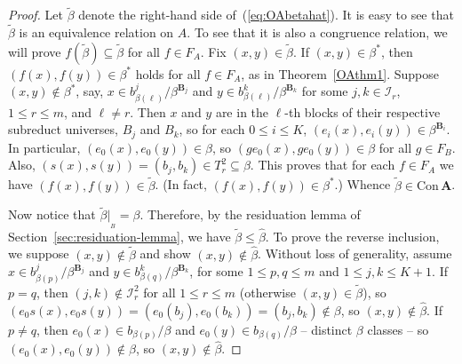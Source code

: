 \documentclass[cm,dissertation]{uhthesis}
\theoremstyle{plain}
\theoremstyle{definition}
\theoremstyle{remark}
\numberwithin{theorem}{section}
\numberwithin{claim}{chapter}
\numberwithin{equation}{section}
\numberwithin{conjecture}{chapter}
\newcommand{\<}{\ensuremath{\langle}}
\renewcommand{\>}{\ensuremath{\rangle}}
\renewcommand{\leq}{\ensuremath{\leqslant}}
\newcommand{\Con}{\ensuremath{\mathrm{Con\,}}}
\newcommand{\0}{\ensuremath{\mathbf{0}}}
\newcommand{\1}{\ensuremath{\mathbf{1}}}
\newcommand{\2}{\ensuremath{\mathbf{2}}}
\newcommand{\3}{\ensuremath{\mathbf{3}}}
\newcommand{\4}{\ensuremath{\mathbf{4}}}
\newcommand{\5}{\ensuremath{\mathbf{5}}}
\newcommand{\bA}{\ensuremath{\mathbf{A}}}
\newcommand{\bB}{\ensuremath{\mathbf{B}}}
\newcommand{\sI}{\ensuremath{\mathscr{I}}}
\newcommand{\resB}{\ensuremath{|_{_B}}}
\newcommand{\tbeta}{\ensuremath{\widetilde{\beta}}}
\begin{document}
\begin{proof}
  Let $\tbeta$ denote the right-hand side of~(\ref{eq:OAbetahat}).  It is
  easy to see that $\tbeta$ is an equivalence relation on $A$.  To see that it
  is also a congruence relation, we will prove $f(\tbeta) \subseteq \tbeta$ for
  all $f\in F_A$.
  Fix $(x,y)\in \tbeta$.  If 
  $(x,y)\in \beta^*$, then $(f(x), f(y)) \in \beta^*$ holds for all $f\in F_A$, as
  in Theorem~\ref{OAthm1}. 
  Suppose $(x,y)\notin \beta^*$, say,  
  $x \in b^j_{\beta(\ell)}/\beta^{\bB_j}$ and 
  $y\in b^k_{\beta(\ell)}/\beta^{\bB_k}$ for some $j, k \in \sI_r$, $1\leq r
  \leq m$, and $\ell\neq r$.  
  Then $x$ and $y$ are in the $\ell$-th blocks of their respective subreduct
  universes, $B_j$ and $B_k$, so 
  for each $0\leq i \leq K$, 
  $(e_i(x), e_i(y)) \in \beta^{\bB_i}$.
  In particular, $(e_0(x), e_0(y)) \in \beta$, so 
  $(g e_0(x), g e_0(y)) \in \beta$ for all $g\in F_B$.
  Also, $(s(x), s(y)) = (b_j, b_k) \in T_r^2 \subseteq \beta$. 
  This proves that for each $f\in F_A$ we have $(f(x), f(y)) \in \tbeta$. (In
  fact, $(f(x), f(y))\in \beta^*$.)  Whence $\tbeta \in \Con\bA$.

  Now notice that $\tbeta\resB = \beta$.  Therefore, by the residuation lemma
  of Section~\ref{sec:residuation-lemma}, we have $\tbeta \leq \widehat{\beta}$.
  To prove the reverse inclusion, we suppose $(x,y)\notin \tbeta$ and show $(x,y) \notin \widehat{\beta}$.
  Without loss of generality, assume $x \in b^j_{\beta(p)}/\beta^{\bB_j}$ and 
  $y\in b^k_{\beta(q)}/\beta^{\bB_k}$, for some $1\leq p, q
  \leq m$ and $1\leq j, k \leq K+1$.  If $p=q$, then $(j,k)\notin \sI_r^2$ for all
  $1\leq r\leq m$ (otherwise $(x,y)\in \tbeta$), so
  $(e_0s(x), e_0s(y)) = (e_0(b_j), e_0(b_k)) = (b_j, b_k) \notin \beta$,
  so $(x,y) \notin \widehat{\beta}$.  If $p\neq q$, then 
  $e_0(x) \in b_{\beta(p)}/\beta$ and $e_0(y)\in b_{\beta(q)}/\beta$ -- distinct $\beta$ classes -- so 
  $(e_0(x),e_0(y))\notin \beta$, so 
  $(x,y) \notin \widehat{\beta}$.


\end{proof}
\end{document}
